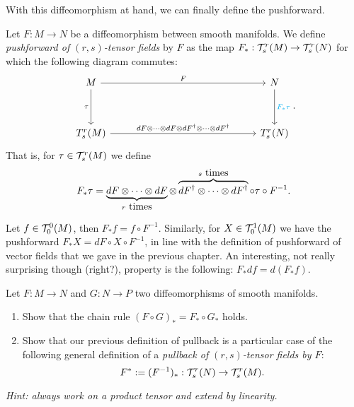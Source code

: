With this diffeomorphism at hand, we can finally define the pushforward.

\begin{definition}
  Let $F:M\to N$ be a diffeomorphism between smooth manifolds.
  We define \emph{pushforward of $(r,s)$-tensor fields} by $F$ as the map $F_*: \mathcal{T}_s^r(M) \to \mathcal{T}_s^r(N)$ for which the following diagram commutes:
  \begin{equation}
    \begin{tikzcd}[row sep=huge, column sep=huge]
      M \arrow[r, "F"] \arrow[d, "\tau" left]
      &[10em] N \arrow[d, "F_* \tau" cyan] \\
      T_s^r(M) \arrow[r, "dF \otimes\cdots\otimes dF \otimes dF^\dagger \otimes\cdots\otimes dF^\dagger "]
      & T_s^r(N)
    \end{tikzcd}.
  \end{equation}
  That is, for $\tau\in\mathcal{T}_s^r(M)$ we define
  \begin{equation}
    F_*\tau = \LaTeXunderbrace{dF \otimes\cdots\otimes dF}_{r\mbox{ times}} \otimes \LaTeXoverbrace{dF^\dagger \otimes\cdots\otimes dF^\dagger }^{s\mbox{ times}} \circ \tau \circ F^{-1}.
  \end{equation}
\end{definition}

\begin{example}
  Let $f\in\mathcal{T}_0^0(M)$, then $F_* f = f\circ F^{-1}$.
  Similarly, for $X\in\mathcal{T}_0^1(M)$ we have the pushforward $F_* X = dF\circ X \circ F^{-1}$, in line with the definition of pushforward of vector fields that we gave in the previous chapter.
  An interesting, not really surprising though (right?), property is the following: $F_* df = d(F_* f)$.
\end{example}

\begin{exercise}[\textit{[homework 3]}]
  Let $F:M\to N$ and $G:N\to P$ two diffeomorphisms of smooth manifolds.
  \begin{enumerate}
    \item Show that the chain rule $(F\circ G)_* = F_* \circ G_*$ holds.
    \item Show that our previous definition of pullback is a particular case of the following general definition of a \emph{pullback of $(r,s)$-tensor fields by $F$}:
    \begin{equation}
      F^* := (F^{-1})_* : \mathcal{T}_s^r(N) \to \mathcal{T}_s^r(M).
    \end{equation}
  \end{enumerate}
  \textit{\small Hint: always work on a product tensor and extend by linearity.}
\end{exercise}

